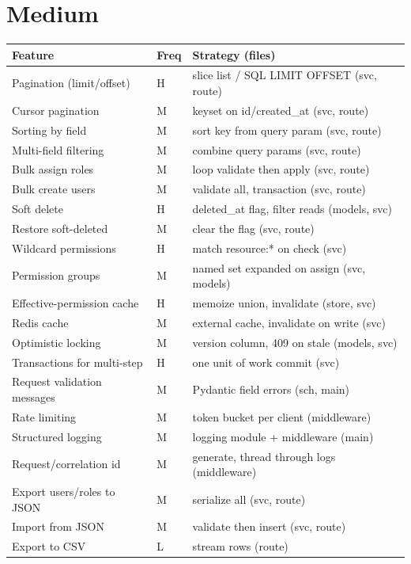 \documentclass[11pt,a4paper]{report}
\begin{document}
\section{Medium}
\begin{longtable}{p{} p{} p{}}
\textbf{Feature} & \textbf{Freq} & \textbf{Strategy (files)} \\
\hline
\endhead
Pagination (limit/offset) & H & slice list / SQL LIMIT OFFSET (svc, route) \\
Cursor pagination & M & keyset on id/created\_at (svc, route) \\
Sorting by field & M & sort key from query param (svc, route) \\
Multi-field filtering & M & combine query params (svc, route) \\
Bulk assign roles & M & loop validate then apply (svc, route) \\
Bulk create users & M & validate all, transaction (svc, route) \\
Soft delete & H & deleted\_at flag, filter reads (models, svc) \\
Restore soft-deleted & M & clear the flag (svc, route) \\
Wildcard permissions & H & match resource:* on check (svc) \\
Permission groups & M & named set expanded on assign (svc, models) \\
Effective-permission cache & H & memoize union, invalidate (store, svc) \\
Redis cache & M & external cache, invalidate on write (svc) \\
Optimistic locking & M & version column, 409 on stale (models, svc) \\
Transactions for multi-step & H & one unit of work commit (svc) \\
Request validation messages & M & Pydantic field errors (sch, main) \\
Rate limiting & M & token bucket per client (middleware) \\
Structured logging & M & logging module + middleware (main) \\
Request/correlation id & M & generate, thread through logs (middleware) \\
Export users/roles to JSON & M & serialize all (svc, route) \\
Import from JSON & M & validate then insert (svc, route) \\
Export to CSV & L & stream rows (route) \\

\end{longtable}
\end{document}
